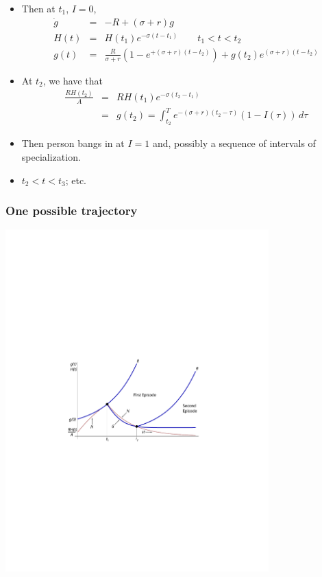 \documentclass[12pt,compress,handout]{beamer}  %
\begin{document}
\begin{frame}
\begin{itemize}[<+->]
\item Then at $t_{1}$, $I=0$,
  \begin{eqnarray*}
    \dot{g} &=& -R +(\sigma +r)g \\
    H(t) &=& H(t_{1}) e^{-\sigma (t -t_{1})} \qquad t_{1} < t < t_{2} \\
    g(t) &=& \frac{R}{\sigma +r} \left( 1 -e^{+(\sigma +r)(t -t_{2})} \right)+g(t_{2})e^{(\sigma +r)(t -t_{2})}
  \end{eqnarray*}

\item At $t_{2}$, we have that
  \begin{eqnarray*}
    \frac{R H(t_{2})}{A} &=& RH(t_{1})e^{-\sigma (t_{2}-t_{1})} \\
     &=& g(t_{2}) = \int_{t_{2}}^{T} e^{-(\sigma +r)(t_{2}-\tau)} (1 -I(\tau))\,d\tau
  \end{eqnarray*}

\item Then person bangs in at $I=1$ and, possibly a sequence of intervals
    of specialization.

\item $t_{2} < t < t_{3}$; etc.
\end{itemize}
\end{frame}


\begin{frame}
\frametitle{One possible trajectory}

\begin{center}
\includegraphics[width=4in]{include/fig-shesh-one-traj}
\end{center}

\end{frame}
\end{document}
